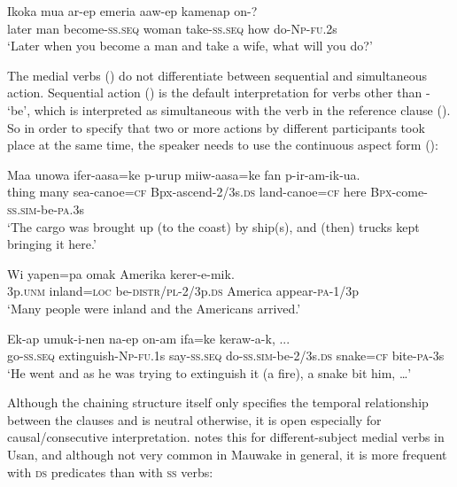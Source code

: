 \ea%
\label{ex:x1445}
\gll Ikoka  mua  ar-ep  emeria  aaw-ep  kamenap  on-? \\
later  man  become-\textsc{ss}.\textsc{seq} woman take-\textsc{ss}.\textsc{seq} how do-\textsc{Np}-\textsc{fu}.2s\\
\glt`Later when you become a man and take a wife, what will you do?'
\z


The  medial verbs () do not differentiate between sequential and simultaneous action. Sequential action () is the default interpretation for verbs other than - `be', which is interpreted as simultaneous with the verb in the reference clause (). So in order to specify that two or more actions by different participants took place at the same time, the speaker needs to use the continuous aspect form ():

\ea%
\label{ex:x1502}
\gll Maa  unowa  ifer-aasa=ke  p-urup miiw-aasa=ke fan  p-ir-am-ik-ua.\\
thing  many  sea-canoe=\textsc{cf} Bpx-ascend-2/3s.\textsc{ds} land-canoe=\textsc{cf} here \textsc{Bpx}-come-\textsc{ss}.\textsc{sim}-be-\textsc{pa}.3s\\
\glt`The cargo was brought up (to the coast) by ship(s), and (then) trucks kept bringing it here.'
\z


\ea%
\label{ex:x1503}
\gll Wi  yapen=pa  omak  Amerika  kerer-e-mik.\\
3p.\textsc{unm} inland=\textsc{loc} be-\textsc{distr}/\textsc{pl}-2/3p.\textsc{ds} America appear-\textsc{pa}-1/3p\\
\glt`Many people were inland and the Americans arrived.'
\z


\ea%
\label{ex:x1472}
\gll Ek-ap  umuk-i-nen  na-ep  on-am ifa=ke  keraw-a-k,  ...\\
go-\textsc{ss}.\textsc{seq} extinguish-\textsc{Np}-\textsc{fu}.1s  say-\textsc{ss}.\textsc{seq} do-\textsc{ss}.\textsc{sim}-be-2/3s.\textsc{ds} snake=\textsc{cf} bite-\textsc{pa}-3s\\
\glt`He went and as he was trying to extinguish it (a fire), a snake bit him, {\dots}'
\z


Although the chaining structure itself only specifies the temporal relationship between the clauses and is neutral otherwise, it is open especially for causal/consecutive interpretation. \citet[237]{Reesink1983} notes this for different-subject medial verbs in Usan, and although not very common in Mauwake in general, it is more frequent with \textsc{ds} predicates than with \textsc{ss} verbs:

